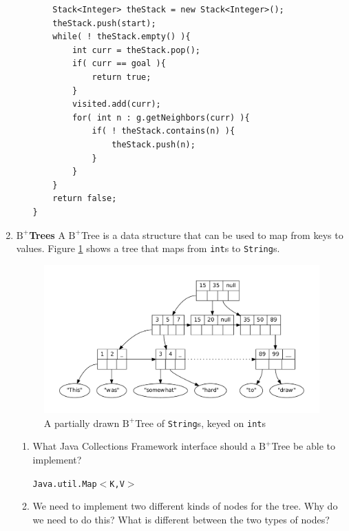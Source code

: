 \documentclass[11pt]{article}
\newenvironment{answer}{\large\lstset{basicstyle=\tiny\ttfamily}\color{white}}{}
\newenvironment{answer}{\large\lstset{basicstyle=\large\ttfamily}\color{red}}{}
\begin{document}
\begin{enumerate}
\begin{enumerate}
\begin{answer}
\begin{lstlisting}
	Stack<Integer> theStack = new Stack<Integer>();
	theStack.push(start);
	while( ! theStack.empty() ){
		int curr = theStack.pop();
		if( curr == goal ){
			return true;
		}
		visited.add(curr);
		for( int n : g.getNeighbors(curr) ){
			if( ! theStack.contains(n) ){
				theStack.push(n);
			}
		}
	}
	return false;
}
\end{lstlisting}
\end{answer}
	\end{enumerate}
            
          


\pagebreak
\item{\bf $\textrm{B}^+$Trees} A $\textrm{B}^+$Tree is a data structure that
can be used to map from keys to values. Figure \ref{b-tree} shows a tree that
maps from {\tt int}s to \texttt{String}s.

\begin{figure}[h]
\caption{A partially drawn $\textrm{B}^+$Tree of \texttt{String}s, keyed on \texttt{int}s}
\label{b-tree}
\center
\includegraphics[width=5in]{b_plus_tree_dot.pdf}
\vspace{-1cm}
\end{figure}

    \begin{enumerate}
    \item What Java Collections Framework interface should a
    $\textrm{B}^+$Tree be able to implement?

        \begin{answer}
        \texttt{Java.util.Map$<$K,V$>$}
        \end{answer}
		\vspace{0.125in}

    \item We need to implement two different kinds of nodes for the tree. Why
    do we need to do this? What is different between the two types of nodes?


\end{enumerate}
\end{enumerate}
\end{document}
